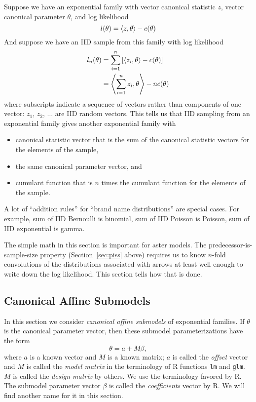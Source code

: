 Suppose we have an exponential family with vector canonical statistic $z$,
vector canonical parameter $\theta$, and log likelihood
$$
   l(\theta) = \langle z, \theta \rangle - c(\theta)
$$
And suppose we have an IID sample
from this family with log likelihood
\begin{equation} \label{eq:iid}
\begin{split}
   l_n(\theta)
   & =
   \sum_{i = 1}^n \left[ \langle z_i, \theta \rangle - c(\theta) \right]
   \\
   & =
   \left\langle \sum_{i = 1}^n z_i, \theta \right\rangle - n c(\theta)
\end{split}
\end{equation}
where subscripts indicate a sequence of vectors rather than components
of one vector: $z_1$, $z_2$, $\ldots$ are IID random vectors.
This tells us that IID sampling from an exponential family gives another
exponential family with
\begin{itemize}
\item canonical statistic vector that is the sum of the canonical statistic
    vectors for the elements of the sample,
\item the same canonical parameter vector, and
\item cumulant function that is $n$ times
    the cumulant function for the elements of the sample.
\end{itemize}

A lot of ``addition rules'' for ``brand name distributions''
are special cases.  For example, sum of IID Bernoulli is binomial, sum of
IID Poisson is Poisson, sum of IID exponential is gamma.

The simple math in this section is important for aster models.
The predecessor-is-sample-size property (Section~\ref{sec:piss} above)
requires us to know
$n$-fold convolutions of the distributions associated with arrows at least
well enough to write down the log likelihood.  This section tells how that
is done.

\subsection{Canonical Affine Submodels}
\label{sec:canonical-affine-submodel}

In this section we consider \emph{canonical affine submodels} of exponential
families.  If $\theta$ is the canonical parameter vector, then these
submodel parameterizations have the form
\begin{equation} \label{eq:affine}
   \theta = a + M \beta,
\end{equation}
where $a$ is a known vector and $M$ is a known matrix; $a$ is called the
\emph{offset} vector and $M$ is called the \emph{model matrix} in the
terminology of R functions \texttt{lm} and \texttt{glm}.
$M$ is called the \emph{design matrix} by others.
We use the terminology favored by R.
The submodel parameter vector $\beta$ is called the \emph{coefficients}
vector by R.  We will find another name for it in this section.

